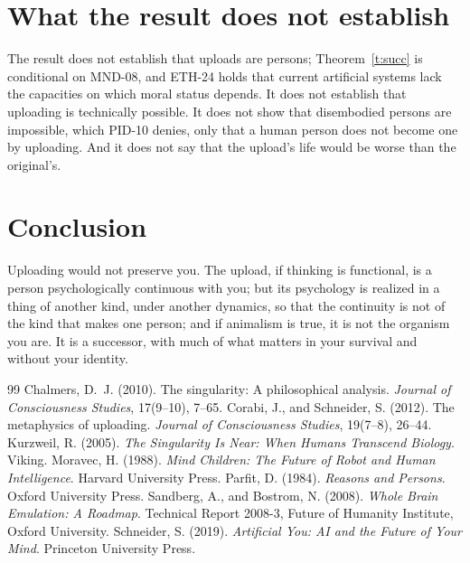 \documentclass{situationist-preprint}
\begin{document}
\section{What the result does not establish}\label{s:not}

The result does not establish that uploads are persons; Theorem~\ref{t:succ} is conditional on MND-08, and ETH-24 holds that current artificial systems lack the capacities on which moral status depends. It does not establish that uploading is technically possible. It does not show that disembodied persons are impossible, which PID-10 denies, only that a human person does not become one by uploading. And it does not say that the upload's life would be worse than the original's.

\section{Conclusion}

Uploading would not preserve you. The upload, if thinking is functional, is a person psychologically continuous with you; but its psychology is realized in a thing of another kind, under another dynamics, so that the continuity is not of the kind that makes one person; and if animalism is true, it is not the organism you are. It is a successor, with much of what matters in your survival and without your identity.

\begin{thebibliography}{99}\small
{} Chalmers, D.~J. (2010). The singularity: A philosophical analysis. \emph{Journal of Consciousness Studies}, 17(9--10), 7--65.
 Corabi, J., and Schneider, S. (2012). The metaphysics of uploading. \emph{Journal of Consciousness Studies}, 19(7--8), 26--44.
 Kurzweil, R. (2005). \emph{The Singularity Is Near: When Humans Transcend Biology}. Viking.
 Moravec, H. (1988). \emph{Mind Children: The Future of Robot and Human Intelligence}. Harvard University Press.
 Parfit, D. (1984). \emph{Reasons and Persons}. Oxford University Press.
 Sandberg, A., and Bostrom, N. (2008). \emph{Whole Brain Emulation: A Roadmap}. Technical Report 2008-3, Future of Humanity Institute, Oxford University.
 Schneider, S. (2019). \emph{Artificial You: AI and the Future of Your Mind}. Princeton University Press.
\end{thebibliography}
\end{document}
